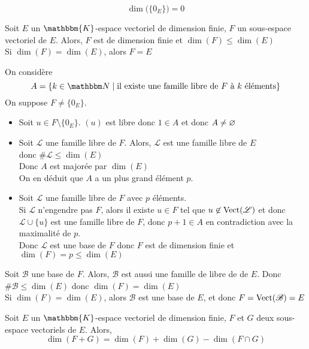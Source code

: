 \begin{rmk}
	[Convention]
	\[\dim\big(\{0_E\}\big) = 0\]
\end{rmk}

\begin{thm}
	Soit $E$ un $\mathbbm{K}$-espace vectoriel de dimension finie, $F$ un sous-espace vectoriel de $E$. Alors, $F$ est de dimension finie et  $\dim(F) \le \dim(E)$\\
	Si $\dim(F) = \dim(E)$, alors $F = E$
\end{thm}

\begin{prv}
	On considère \[
		A = \{k \in \N \mid \text{il existe une famille libre de $F$ à $k$ éléments}\} 
	\]
	On suppose $F \neq \{0_E\}$.
	\begin{itemize}
		\item Soit $u \in F\setminus \{0_E\}$. $(u)$ est libre donc $1 \in A$ et donc $A \neq \varnothing$
		\item Soit $\mathcal{L}$ une famille libre de $F$. Alors, $\mathcal{L}$ est une famille libre de $E$ \\
			donc $\#\mathcal{L} \le \dim(E)$\\
			Donc $A$ est majorée par $\dim(E)$ \\
			On en déduit que $A$ a un plus grand élément $p$.
		\item Soit $\mathcal{L}$ une famille libre de $F$ avec $p$ éléments.\\
			Si $\mathcal{L}$ n'engendre pas $F$, alors il existe $u\in F$ tel que $u\not\in \operatorname{Vect}(\mathcal{L})$ et donc $\mathcal{L} \cup \{u\}$ est une famille libre de $F$, donc $p+1 \in A$ en contradiction avec la maximalité de $p$.\\
			Donc $\mathcal{L}$ est une base de $F$ donc $F$ est de dimension finie et $\dim(F) = p \le \dim(E)$\\
	\end{itemize}

	Soit $\mathcal{B}$ une base de $F$. Alors, $\mathcal{B}$ est aussi une famille de libre de de $E$. Donc $\#\mathcal{B} \le \dim(E)$ donc $\dim(F) = \dim(E)$ \\
	Si $\dim(F) = \dim(E)$, alors $\mathcal{B}$ est une base de $E$, et donc $F = \operatorname{Vect}(\mathcal{B}) = E$
\end{prv}

\begin{prop}
	Soit $E$ un $\mathbbm{K}$-espace vectoriel de dimension finie, $F$ et $G$ deux sous-espace vectoriels de $E$. Alors, \[
		\dim(F+G) = \dim(F) + \dim(G) - \dim(F\cap G)
	\] 
\end{prop}

